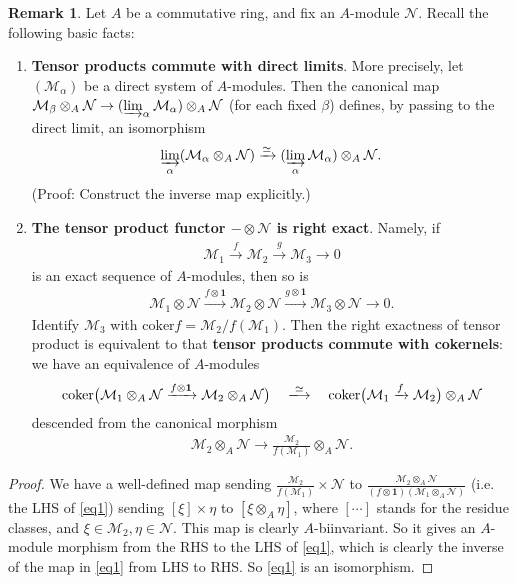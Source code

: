 \documentclass[12pt,b5paper,notitlepage]{report}
\theoremstyle{definition}
\newtheorem{rem}[df]{Remark}
\theoremstyle{plain}
\newcommand{\mc}{\mathcal}
\newcommand{\id}{\mathbf{1}}
\newcommand{\coker}{\mathrm{coker}}
\numberwithin{equation}{section}
\begin{document}
\begin{rem}
Let $A$ be a commutative ring, and fix an $A$-module $\mc N$. Recall the following basic facts:
\begin{enumerate}[label=\arabic*.]
\item \textbf{Tensor products commute with direct limits}. More precisely, let $(\mc M_\alpha)$ be a direct system of $A$-modules. Then the canonical map $\mc M_\beta\otimes_A\mc N\rightarrow(\varinjlim_\alpha \mc M_\alpha)\otimes_A\mc N$ (for each fixed $\beta$) defines, by passing to the direct limit, an isomorphism
\begin{align}
\varinjlim_\alpha (\mc M_\alpha\otimes_A\mc N)\xrightarrow{\simeq} (\varinjlim_\alpha \mc M_\alpha)\otimes_A\mc N.
\end{align}
(Proof: Construct the inverse map explicitly.)
\item \textbf{The tensor product functor $-\otimes\mc N$ is right exact}.  Namely, if
\begin{align*}
\mc M_1\xrightarrow{f}\mc M_2\xrightarrow{g}\mc M_3\rightarrow0
\end{align*}
is an exact sequence of $A$-modules, then so is
\begin{align*}
\mc M_1\otimes\mc N\xrightarrow{f\otimes\id}\mc M_2\otimes\mc N\xrightarrow{g\otimes\id}\mc M_3\otimes\mc N\rightarrow 0.
\end{align*}
Identify $\mc M_3$ with $\coker f=\mc M_2/f(\mc M_1)$. Then the right exactness of tensor product is equivalent to that \textbf{tensor products commute with cokernels}: we have an equivalence of $A$-modules
\begin{align}
\coker\big(\mc M_1\otimes_A\mc N\xrightarrow{f\otimes\id}\mc M_2\otimes_A\mc N \big)\quad\xlongrightarrow{\simeq}\quad \coker\big(\mc M_1\xrightarrow{f}\mc M_2\big)\otimes_A\mc N\label{eq1}
\end{align}
descended from the canonical morphism
\begin{align}
\mc M_2\otimes_A\mc N\longrightarrow \frac{\mc M_2}{f(\mc M_1)}\otimes_A\mc N.
\end{align}
\end{enumerate}
\hfill\qedsymbol
\end{rem}

\begin{proof}
We have a well-defined map sending $\frac{\mc M_2}{f(\mc M_1)}\times\mc N$ to $\frac{\mc M_2\otimes_A\mc N}{(f\otimes\id)(\mc M_1\otimes_A\mc N)}$ (i.e. the LHS of \eqref{eq1}) sending $[\xi]\times\eta$ to $[\xi\otimes_A\eta]$, where $[\cdots]$ stands for the residue classes, and $\xi\in\mc M_2,\eta\in\mc N$. This map is clearly $A$-biinvariant. So it gives an $A$-module morphism from the RHS to the LHS of \eqref{eq1}, which is clearly the inverse of the map in \eqref{eq1} from LHS to RHS. So \eqref{eq1} is an isomorphism.
\end{proof}
\end{document}
